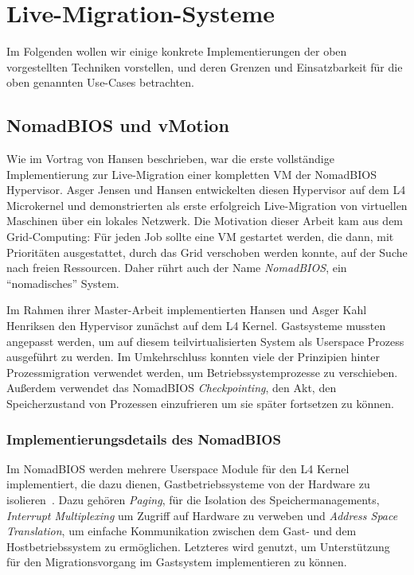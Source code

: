\section{Live-Migration-Systeme}
\label{sec:live-migr-syst}
Im Folgenden wollen wir einige konkrete Implementierungen der oben
vorgestellten Techniken vorstellen, und deren Grenzen und
Einsatzbarkeit für die oben genannten Use-Cases betrachten.

\subsection{NomadBIOS und vMotion}
\label{sec:nomadbios--vmware}
Wie im Vortrag von Hansen beschrieben, war die erste vollständige
Implementierung zur Live-Migration einer kompletten \ac{VM} der
NomadBIOS Hypervisor. Asger Jensen und Hansen entwickelten diesen
Hypervisor auf dem L4 Microkernel und demonstrierten als erste
erfolgreich Live-Migration von virtuellen Maschinen über ein lokales
Netzwerk. Die Motivation dieser Arbeit kam aus dem Grid-Computing: Für
jeden Job sollte eine \ac{VM} gestartet werden, die dann, mit
Prioritäten ausgestattet, durch das Grid verschoben werden konnte, auf
der Suche nach freien Ressourcen. Daher rührt auch der Name
\emph{NomadBIOS}, ein "`nomadisches"' System.

Im Rahmen ihrer Master-Arbeit implementierten Hansen und Asger Kahl
Henriksen den Hypervisor zunächst auf dem L4 Kernel. Gastsysteme
mussten angepasst werden, um auf diesem teilvirtualisierten System als
Userspace Prozess ausgeführt zu werden. Im Umkehrschluss konnten viele
der Prinzipien hinter Prozessmigration verwendet werden, um
Betriebssystemprozesse zu verschieben. Außerdem verwendet das
NomadBIOS \emph{Checkpointing}, den Akt, den Speicherzustand von
Prozessen einzufrieren um sie später fortsetzen zu können.

\subsubsection{Implementierungsdetails des NomadBIOS}
\label{sec:impl-des-nomadb}
Im NomadBIOS werden mehrere Userspace Module für den L4 Kernel
implementiert, die dazu dienen, Gastbetriebssysteme von der Hardware
zu isolieren~\cite{hansen2002nomadic}. Dazu gehören \emph{Paging}, für
die Isolation des Speichermanagements, \emph{Interrupt Multiplexing}
um Zugriff auf Hardware zu verweben und \emph{Address Space
  Translation}, um einfache Kommunikation zwischen dem Gast- und dem
Hostbetriebssystem zu ermöglichen. Letzteres wird genutzt, um
Unterstützung für den Migrationsvorgang im Gastsystem implementieren
zu können.

